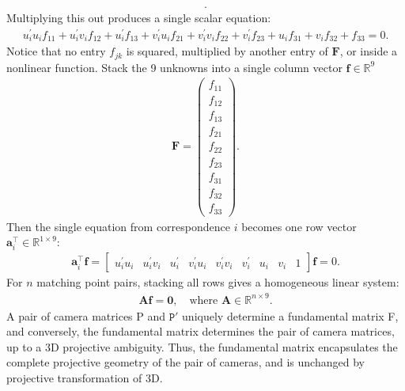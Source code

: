 \documentclass{report}
\begin{document}
\begin{itemize}
\begin{align*}
            .\end{align*}
            Multiplying this out produces a single scalar equation:
            \begin{align*}
                u_{i}^{\prime }u_{i}f_{11}+u_{i}^{\prime }v_{i}f_{12}+u_{i}^{\prime }f_{13}+v_{i}^{\prime }u_{i}f_{21}+v_{i}^{\prime }v_{i}f_{22}+v_{i}^{\prime }f_{23}+u_{i}f_{31}+v_{i}f_{32}+f_{33}=0
            .\end{align*}
            Notice that no entry \(f_{jk}\) is squared, multiplied by another entry of \(\mathbf{F}\), or inside a nonlinear function. 
            \bigbreak \noindent 
            Stack the 9 unknowns into a single column vector \(\mathbf{f} \in \mathbb{R}^9\)
            \begin{align*}
                \mathbf{F} = \begin{pmatrix} f_{11} \\ f_{12} \\ f_{13} \\ f_{21} \\ f_{22} \\ f_{23} \\ f_{31} \\ f_{32} \\ f_{33} \end{pmatrix}
            .\end{align*}
            Then the single equation from correspondence \(i\) becomes one row vector \(\mathbf{a}_i^\top \in \mathbb{R}^{1 \times 9}\):
            \begin{align*}
                \mathbf{a}_{i}^{\top }\mathbf{f}=\left[\begin{matrix}u_{i}^{\prime }u_{i}&u_{i}^{\prime }v_{i}&u_{i}^{\prime }&v_{i}^{\prime }u_{i}&v_{i}^{\prime }v_{i}&v_{i}^{\prime }&u_{i}&v_{i}&1\end{matrix}\right]\mathbf{f}=0
            .\end{align*}
            For \(n\) matching point pairs, stacking all rows gives a homogeneous linear system:
            \begin{align*}
                \mathbf{Af}=\mathbf{0},\quad \text{where\ }\mathbf{A}\in \mathbb{R}^{n\times 9}
            .\end{align*}
            A pair of camera matrices P and $\mathtt{P}'$ uniquely determine a fundamental matrix F, and conversely, the fundamental matrix determines the pair of camera matrices, up to a 3D projective ambiguity. Thus, the fundamental matrix encapsulates the complete projective geometry of the pair of cameras, and is unchanged by projective transformation of 3D.

\end{itemize}
\end{document}
